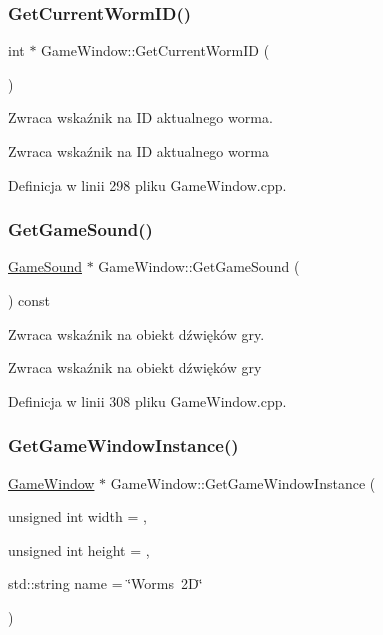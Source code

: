 \subsubsection{\texorpdfstring{Get\+Current\+Worm\+I\+D()}{GetCurrentWormID()}}
{\footnotesize\ttfamily int $\ast$ Game\+Window\+::\+Get\+Current\+Worm\+ID (\begin{DoxyParamCaption}{ }\end{DoxyParamCaption})}



Zwraca wskaźnik na ID aktualnego worma. 

\begin{DoxyReturn}{Zwraca}
wskaźnik na ID aktualnego worma 
\end{DoxyReturn}


Definicja w linii 298 pliku Game\+Window.\+cpp.

\mbox{\label{class_game_window_aa3280056f0018da1eee85ccb1e5fd2ac}} 
\subsubsection{\texorpdfstring{Get\+Game\+Sound()}{GetGameSound()}}
{\footnotesize\ttfamily \mbox{\hyperlink{class_game_sound}{Game\+Sound}} $\ast$ Game\+Window\+::\+Get\+Game\+Sound (\begin{DoxyParamCaption}{ }\end{DoxyParamCaption}) const}



Zwraca wskaźnik na obiekt dźwięków gry. 

\begin{DoxyReturn}{Zwraca}
wskaźnik na obiekt dźwięków gry 
\end{DoxyReturn}


Definicja w linii 308 pliku Game\+Window.\+cpp.

\mbox{\label{class_game_window_a9c480a3795bfd6d22a9dc8a3bae47b1b}} 
\subsubsection{\texorpdfstring{Get\+Game\+Window\+Instance()}{GetGameWindowInstance()}}
{\footnotesize\ttfamily \mbox{\hyperlink{class_game_window}{Game\+Window}} $\ast$ Game\+Window\+::\+Get\+Game\+Window\+Instance (\begin{DoxyParamCaption}\item[{unsigned int}]{width = {},  }\item[{unsigned int}]{height = {},  }\item[{std\+::string}]{name = {\ttfamily \char`\"{}Worms~2D\char`\"{}} }\end{DoxyParamCaption})\hspace{0.3cm}{\ttfamily [static]}}



